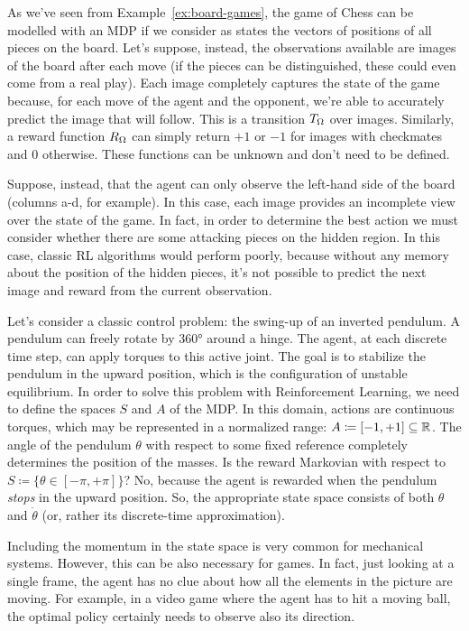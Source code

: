 \begin{example}
	As we've seen from Example~\vref{ex:board-games}, the game of Chess can
	be modelled with an MDP if we consider as states the vectors of positions of
	all pieces on the board. Let's suppose, instead, the observations available
	are images of the board after each move (if the pieces can be distinguished,
	these could even come from a real play). Each image completely captures the
	state of the game because, for each move of the agent and the opponent,
	we're able to accurately predict the image that will follow. This is a
	transition $T_\Omega$ over images. Similarly, a reward function $R_\Omega$ can
	simply return $+1$ or $-1$ for images with checkmates and 0 otherwise. These
	functions can be unknown and don't need to be defined.

	Suppose, instead, that the agent can only observe the left-hand side of the
	board (columns a-d, for example). In this case, each image provides an
	incomplete view over the state of the game. In fact, in order to determine
	the best action we must consider whether there are some attacking pieces on
	the hidden region. In this case, classic RL algorithms would perform poorly,
	because without any memory about the position of the hidden pieces, 
	it's not possible to predict the next image and reward from the current
	observation.
\end{example}

\begin{example}
	Let's consider a classic control problem: the swing-up of an inverted
	pendulum. A pendulum can freely rotate by 360° around a hinge. The agent, at
	each discrete time step, can apply torques to this active joint.  The goal
	is to stabilize the pendulum in the upward position, which is the
	configuration of unstable equilibrium. In order to solve this problem with
	Reinforcement Learning, we need to define the spaces $S$ and $A$ of the MDP.
	In this domain, actions are continuous torques, which may be represented in
	a normalized range: $A \coloneqq [-1, +1] \subseteq \mathbb{R}$. The angle of the
	pendulum $\theta$ with respect to some fixed reference completely determines
	the position of the masses. Is the reward Markovian with respect to $S
	\coloneqq \{\theta \in [-\pi, +\pi]\}$? No, because the agent is rewarded
	when the pendulum \emph{stops} in the upward position. So, the appropriate
	state space consists of both $\theta$ and $\dot\theta$ (or, rather its
	discrete-time approximation).

	Including the momentum in the state space is very common for mechanical
	systems. However, this can be also necessary for games. In fact, just
	looking at a single frame, the agent has no clue about how all the elements
	in the picture are moving.  For example, in a video game where the agent has
	to hit a moving ball, the optimal policy certainly needs to observe also its
	direction.
	\label{ex:motion}
\end{example}


